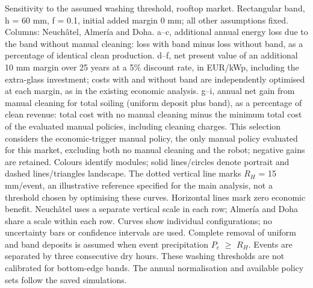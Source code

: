 Sensitivity to the assumed washing threshold, rooftop market. Rectangular band, h = 60 mm, f = 0.1, initial added margin 0 mm; all other assumptions fixed. Columns: Neuchâtel, Almería and Doha. a–c, additional annual energy loss due to the band without manual cleaning: loss with band minus loss without band, as a percentage of identical clean production. d–f, net present value of an additional 10 mm margin over 25 years at a 5\% discount rate, in EUR/kWp, including the extra-glass investment; costs with and without band are independently optimised at each margin, as in the existing economic analysis. g–i, annual net gain from manual cleaning for total soiling (uniform deposit plus band), as a percentage of clean revenue: total cost with no manual cleaning minus the minimum total cost of the evaluated manual policies, including cleaning charges. This selection considers the economic-trigger manual policy, the only manual policy evaluated for this market, excluding both no manual cleaning and the robot; negative gains are retained. Colours identify modules; solid lines/circles denote portrait and dashed lines/triangles landscape. The dotted vertical line marks $R_H$ = 15 mm/event, an illustrative reference specified for the main analysis, not a threshold chosen by optimising these curves. Horizontal lines mark zero economic benefit. Neuchâtel uses a separate vertical scale in each row; Almería and Doha share a scale within each row. Curves show individual configurations; no uncertainty bars or confidence intervals are used. Complete removal of uniform and band deposits is assumed when event precipitation $P_e$ $\geq$ $R_H$. Events are separated by three consecutive dry hours. These washing thresholds are not calibrated for bottom-edge bands. The annual normalisation and available policy sets follow the saved simulations.
